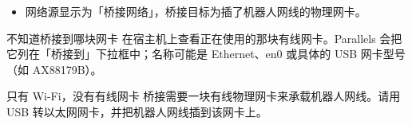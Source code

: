 \begin{expected}
\begin{itemize}
\item 网络源显示为「桥接网络」，桥接目标为插了机器人网线的物理网卡。
\end{itemize}
\end{expected}

\begin{faq}{不知道桥接到哪块网卡}
在宿主机上查看正在使用的那块有线网卡。Parallels 会把它列在「桥接到」下拉框中；名称可能是 Ethernet、en0 或具体的 USB 网卡型号（如 AX88179B）。
\end{faq}
\begin{faq}{只有 Wi-Fi，没有有线网卡}
桥接需要一块有线物理网卡来承载机器人网线。请用 USB 转以太网网卡，并把机器人网线插到该网卡上。
\end{faq}
